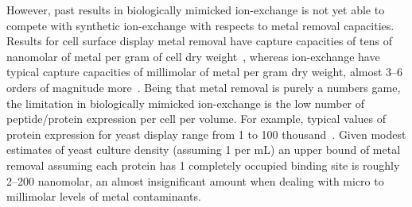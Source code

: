 \documentclass[../main/main]{subfiles}
\begin{document}
However, past results in biologically mimicked ion-exchange is not yet able to compete with synthetic ion-exchange with respects to metal removal capacities. Results for cell surface display metal removal have capture capacities of tens of nanomolar of metal per gram of cell dry weight~\cite{sousa1996,kuroda2003,ruta2017}, whereas ion-exchange have typical capture capacities of millimolar of metal per gram dry weight, almost 3--6 orders of magnitude more~\cite{p.stathi2013,barakat2011new}. Being that metal removal is purely a numbers game, the limitation in biologically mimicked ion-exchange is the low number of peptide/protein expression per cell per volume. For example, typical values of protein expression for yeast display range from 1 to 100 thousand~\cite{kieke1999,rutherford2006}. Given modest estimates of yeast culture density (assuming 1 \OD{} per mL) an upper bound of metal removal assuming each protein has 1 completely occupied binding site is roughly 2--200 nanomolar, an almost insignificant amount when dealing with micro to millimolar levels of metal contaminants.
\end{document}
